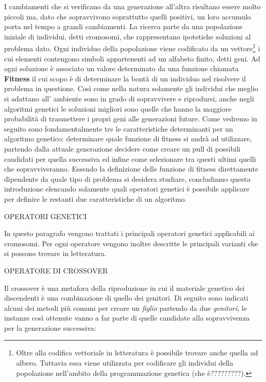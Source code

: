 \documentclass[11pt]{article}
\begin{document}
I cambiamenti che si verificano da una generazione all'altra risultano essere molto piccoli ma, dato che sopravvivono soprattutto quelli positivi, un loro accumulo porta nel tempo a grandi cambiamenti.
La ricerca parte da una popolazione iniziale di individui, detti cromosomi, che rappresentano ipotetiche soluzioni al problema dato. Ogni individuo della popolazione viene codificato da un vettore\footnote{Oltre alla codifica vettoriale in letteratura è possibile trovare anche quella ad albero. Tuttavia essa viene utilizzata per codificare gli individui della popolazione nell'ambito della programmazione genetica (che è?????????).} i cui elementi contengono simboli appartenenti ad un alfabeto finito, detti geni. Ad ogni soluzione è associato un valore determinato da una funzione chiamata \textbf{Fitness} il cui scopo è di determinare la bontà di un individuo nel risolvere il problema in questione.
Così come nella natura solamente gli individui che meglio si adattano all' ambiente sono in grado di sopravvivere e riprodursi, anche negli algoritmi genetici le soluzioni migliori sono quelle che hanno la maggiore probabilità di trasmettere i propri geni alle generazioni future.
Come vedremo in seguito sono fondamentalmente tre le caratteristiche determinanti per un algoritmo genetico: determinare quale funzione di fitness si andrà ad utilizzare, partendo dalla attuale generazione decidere come creare un pull di possibili candidati per quella successiva ed infine come selezionare tra questi ultimi quelli che sopravviveranno.
Essendo la definizione delle funzione di fitness direttamente dipendente da quale tipo di problema si desidera studiare, concludiamo questa introduzione elencando solamente quali operatori genetici è possibile applicare per definire le restanti due caratteristiche di un algoritmo.


\vspace{2\baselineskip}
OPERATORI GENETICI
\vspace{2\baselineskip}

In questo paragrafo vengono trattati i principali operatori genetici applicabili ai cromosomi. Per ogni operatore vengono inoltre descritte le principali varianti che si possono trovare in letteratura.


\vspace{2\baselineskip}
OPERATORE DI CROSSOVER
\vspace{2\baselineskip}

Il crossover è una metafora della riproduzione in cui il materiale genetico dei discendenti è una combinazione di quello dei genitori. Di seguito sono indicati alcuni dei metodi più comuni per creare un \textit{figlio} partendo da due \textit{genitori}, le instanze così ottenute vanno a far parte di quelle candidate alla sopravvivenza per la generazione successiva:
\end{document}
